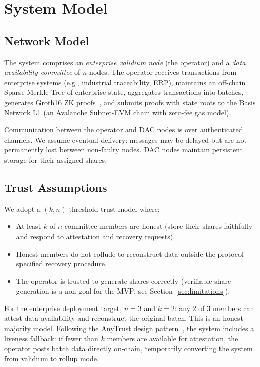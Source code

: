 
\section{System Model}

\subsection{Network Model}

The system comprises an \emph{enterprise validium node} (the operator) and a
\emph{data availability committee} of $n$ nodes. The operator receives
transactions from enterprise systems (e.g., industrial traceability, ERP),
maintains an off-chain Sparse Merkle Tree of enterprise state, aggregates
transactions into batches, generates Groth16 ZK proofs~\cite{groth2016size},
and submits proofs with state roots to the Basis Network L1 (an Avalanche
Subnet-EVM chain with zero-fee gas model).

Communication between the operator and DAC nodes is over authenticated
channels. We assume eventual delivery: messages may be delayed but are not
permanently lost between non-faulty nodes. DAC nodes maintain persistent
storage for their assigned shares.

\subsection{Trust Assumptions}

We adopt a $(k,n)$-threshold trust model where:

\begin{itemize}
\item At least $k$ of $n$ committee members are honest (store their shares
  faithfully and respond to attestation and recovery requests).
\item Honest members do not collude to reconstruct data outside the
  protocol-specified recovery procedure.
\item The operator is trusted to generate shares correctly (verifiable share
  generation is a non-goal for the MVP; see Section~\ref{sec:limitations}).
\end{itemize}

For the enterprise deployment target, $n = 3$ and $k = 2$: any 2 of 3 members
can attest data availability and reconstruct the original batch. This is an
honest-majority model. Following the AnyTrust design
pattern~\cite{arbitrum2024anytrust}, the system includes a liveness fallback:
if fewer than $k$ members are available for attestation, the operator posts
batch data directly on-chain, temporarily converting the system from validium
to rollup mode.

